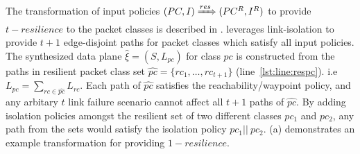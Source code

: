 \noindent The transformation of input policies $(PC, I) \xRightarrow{res} (PC^R, I^R)$ to provide $t-resilience$ to the packet classes is described in . 
\name leverages link-isolation to provide $t+1$ edge-disjoint paths for packet classes which satisfy all input policies.  
The synthesized data plane $\hat{\xi} = (S, L_{pc})$ for class $pc$ is constructed from the 
paths in resilient packet class set $\hat{pc} = \{rc_1,\ldots,rc_{t+1}\}$ (line~\ref{lst:line:respc}).
i.e $L_{pc} = \sum\limits_{rc \in \hat{pc}} L_{rc}$. 
Each path of $\hat{pc}$ satisfies the reachability/waypoint policy, and any arbitary $t$ link failure scenario cannot affect all $t+1$ paths of $\hat{pc}$.
By adding isolation policies amongst the resilient set of two different classes $pc_1$ and $pc_2$, any path from the sets
would satisfy the isolation policy $pc_1 || \ pc_2$.
(a) demonstrates an example transformation for providing $1-resilience$. 

